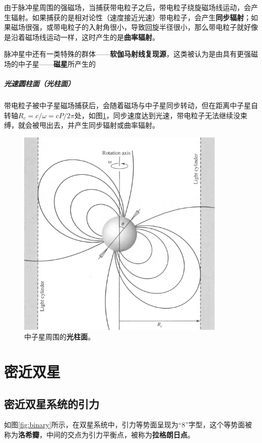 \documentclass[openany]{ctexbook}
\begin{document}
由于脉冲星周围的强磁场，当捕获带电粒子之后，带电粒子绕旋磁场线运动，会产生辐射。如果捕获的是相对论性（速度接近光速）带电粒子，会产生\textbf{同步辐射}；如果磁场很强，或带电粒子的入射角很小，导致回旋半径很小，那么带电粒子就好像是沿着磁场线运动一样，这时产生的是\textbf{曲率辐射}。

脉冲星中还有一类特殊的群体——\textbf{软伽马射线复现源}，这类被认为是由具有更强磁场的中子星——\textbf{磁星}所产生的

\paragraph{光速圆柱面（光柱面）}
带电粒子被中子星磁场捕获后，会随着磁场与中子星同步转动，但在距离中子星自转轴$R_c=c/\omega=cP/2\pi$处，如图\ref{fig:lightcylinder}，同步速度达到光速，带电粒子无法继续没束缚，就会被甩出去，并产生同步辐射或曲率辐射。

\begin{figure}[hbt]
  \centering
  \includegraphics[width=10cm]{chapters/16/lightcylinder}
  \caption{中子星周围的\textbf{光柱面}。}
  \label{fig:lightcylinder}
\end{figure}

\setcounter{chapter}{17}
\chapter{密近双星}
\section{密近双星系统的引力}
如图\ref{fig:binary}所示，在双星系统中，引力等势面呈现为``8''字型，这个等势面被称为\textbf{洛希瓣}，中间的交点为引力平衡点，被称为\textbf{拉格朗日点}。
\end{document}
